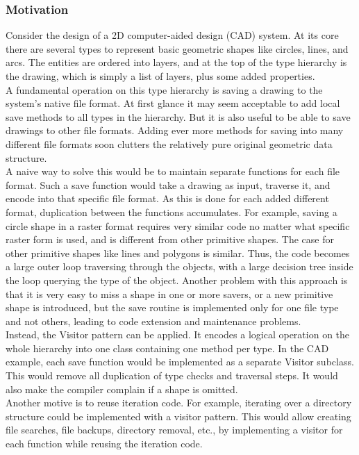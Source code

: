 \subsubsection{Motivation}
Consider the design of a 2D computer-aided design (CAD) system. At its core there are several types to represent basic geometric shapes like circles, lines, and arcs. The entities are ordered into layers, and at the top of the type hierarchy is the drawing, which is simply a list of layers, plus some added properties.\\
A fundamental operation on this type hierarchy is saving a drawing to the system's native file format. At first glance it may seem acceptable to add local save methods to all types in the hierarchy. But it is also useful to be able to save drawings to other file formats. Adding ever more methods for saving into many different file formats soon clutters the relatively pure original geometric data structure.\\
A naive way to solve this would be to maintain separate functions for each file format. Such a save function would take a drawing as input, traverse it, and encode into that specific file format. As this is done for each added different format, duplication between the functions accumulates. For example, saving a circle shape in a raster format requires very similar code no matter what specific raster form is used, and is different from other primitive shapes. The case for other primitive shapes like lines and polygons is similar. Thus, the code becomes a large outer loop traversing through the objects, with a large decision tree inside the loop querying the type of the object. Another problem with this approach is that it is very easy to miss a shape in one or more savers, or a new primitive shape is introduced, but the save routine is implemented only for one file type and not others, leading to code extension and maintenance problems.\\
Instead, the Visitor pattern can be applied. It encodes a logical operation on the whole hierarchy into one class containing one method per type. In the CAD example, each save function would be implemented as a separate Visitor subclass. This would remove all duplication of type checks and traversal steps. It would also make the compiler complain if a shape is omitted.\\
Another motive is to reuse iteration code. For example, iterating over a directory structure could be implemented with a visitor pattern. This would allow creating file searches, file backups, directory removal, etc., by implementing a visitor for each function while reusing the iteration code.
